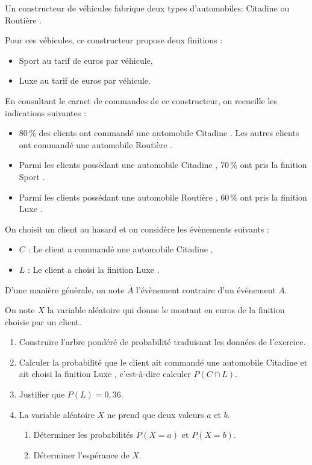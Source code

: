 \medskip

Un constructeur de véhicules fabrique deux types d'automobiles: \og Citadine\fg{} ou \og Routière \fg.

Pour ces véhicules, ce constructeur propose deux finitions :

\begin{itemize}
\item \og Sport\fg{} au tarif de  euros par véhicule, 
\item \og Luxe\fg{} au tarif de  euros par véhicule.
\end{itemize}

En consultant le carnet de commandes de ce constructeur, on recueille les indications suivantes :

\setlength\parindent{9mm}
\begin{itemize}
\item[$\bullet~~$] 80\,\% des clients ont commandé une automobile \og Citadine \fg. Les autres clients ont commandé une automobile \og Routière \fg.
\item[$\bullet~~$] Parmi les clients possédant une automobile \og Citadine \fg, 70\,\% ont pris la finition \og Sport \fg.
\item[$\bullet~~$] Parmi les clients possédant une automobile \og Routière \fg, 60\,\% ont pris la finition \og Luxe \fg.
\end{itemize}
\setlength\parindent{0mm}

On choisit un client au hasard et on considère les évènements suivants : 

\setlength\parindent{9mm}
\begin{itemize}
\item[$\bullet~~$] $C$ : \og Le client a commandé une automobile \og Citadine\fg{} \fg,
\item[$\bullet~~$] $L$ : \og Le client a choisi la finition \og Luxe\fg{} \fg.
\end{itemize}
\setlength\parindent{0mm}

D'une manière générale, on note $\overline{A}$ l'évènement contraire d'un évènement $A$.

On note $X$ la variable aléatoire qui donne le montant en euros de la finition choisie par un client.

\medskip

\begin{enumerate}
\item Construire l'arbre pondéré de probabilité traduisant les données de l'exercice.
\item Calculer la probabilité que le client ait commandé une automobile \og Citadine\fg{} et ait choisi la
finition \og Luxe \fg, c'est-à-dire calculer $P(C \cap L)$.
\item Justifier que $P(L) = 0,36$.
\item La variable aléatoire $X$ ne prend que deux valeurs $a$ et $b$.
	\begin{enumerate}
		\item Déterminer les probabilités $P(X = a)$ et $P(X = b)$. 
		\item Déterminer l'espérance de $X$.
	\end{enumerate}
\end{enumerate}

\bigskip
